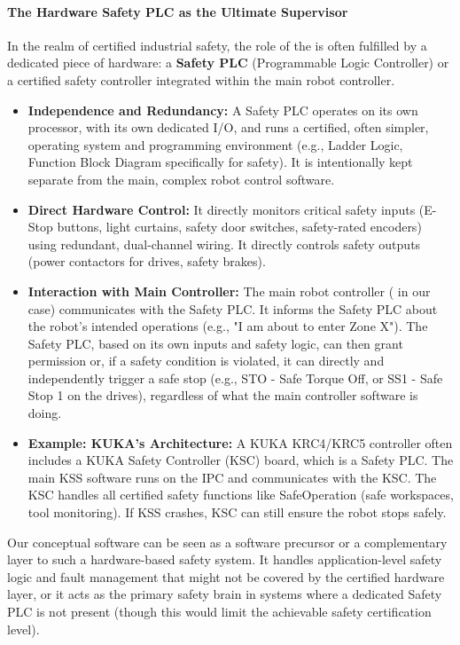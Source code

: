 \paragraph{The Hardware Safety PLC as the Ultimate Supervisor}
In the realm of certified industrial safety, the role of the  is often fulfilled by a dedicated piece of hardware: a \textbf{Safety PLC} (Programmable Logic Controller) or a certified safety controller integrated within the main robot controller.
\begin{itemize}
    \item \textbf{Independence and Redundancy:} A Safety PLC operates on its own processor, with its own dedicated I/O, and runs a certified, often simpler, operating system and programming environment (e.g., Ladder Logic, Function Block Diagram specifically for safety). It is intentionally kept separate from the main, complex robot control software.
    \item \textbf{Direct Hardware Control:} It directly monitors critical safety inputs (E-Stop buttons, light curtains, safety door switches, safety-rated encoders) using redundant, dual-channel wiring. It directly controls safety outputs (power contactors for drives, safety brakes).
    \item \textbf{Interaction with Main Controller:} The main robot controller ( in our case) communicates with the Safety PLC. It informs the Safety PLC about the robot's intended operations (e.g., "I am about to enter Zone X"). The Safety PLC, based on its own inputs and safety logic, can then grant permission or, if a safety condition is violated, it can directly and independently trigger a safe stop (e.g., STO - Safe Torque Off, or SS1 - Safe Stop 1 on the drives), regardless of what the main controller software is doing.
    \item \textbf{Example: KUKA's Architecture:} A KUKA KRC4/KRC5 controller often includes a KUKA Safety Controller (KSC) board, which is a Safety PLC. The main KSS software runs on the IPC and communicates with the KSC. The KSC handles all certified safety functions like SafeOperation (safe workspaces, tool monitoring). If KSS crashes, KSC can still ensure the robot stops safely.
\end{itemize}
Our conceptual software  can be seen as a software precursor or a complementary layer to such a hardware-based safety system. It handles application-level safety logic and fault management that might not be covered by the certified hardware layer, or it acts as the primary safety brain in systems where a dedicated Safety PLC is not present (though this would limit the achievable safety certification level).

